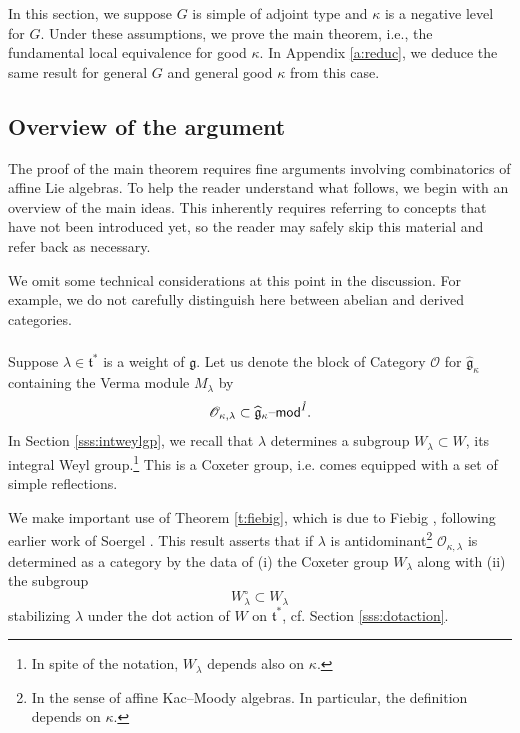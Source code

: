 \documentclass[11pt,reqno]{amsart}
\newcommand{\g}{\widehat{\mathfrak{g}}}
\newcommand{\ft}{\mathfrak{t}}
\newcommand{\fg}{\mathfrak{g}}
\newcommand{\OO}{\mathscr{O}}
\newcommand{\gk}{\g_\kappa}
\theoremstyle{remark}
\numberwithin{equation}{section}
\renewcommand{\mod}{\text{\textendash}\mathsf{mod}}
\begin{document}
In this section, we suppose $G$ is simple of adjoint type
and $\kappa$ is a negative level for $G$. Under these assumptions,
we prove the main theorem, i.e., the fundamental local
equivalence for good $\kappa$. In Appendix \ref{a:reduc}, we deduce the 
same result for general $G$ and general good $\kappa$ from this case.

\subsection{Overview of the argument}\label{ss:overview}

The proof of the main theorem requires fine arguments involving
combinatorics of affine Lie algebras. To help the reader understand what
follows, we begin with an overview
of the main ideas. 
This inherently requires referring to concepts that have not been
introduced yet, so the reader may safely skip this material and
refer back as necessary.

We omit some technical considerations at this point
in the discussion. For example, we do not carefully
distinguish here between abelian and derived
categories.

\subsubsection{}

Suppose $\lambda \in \ft^{*}$ is a weight of $\fg$.
Let us denote the block of Category $\OO$ for $\gk$ containing the Verma module 
$M_\lambda$ by 
%
\[\OO_{\kappa,\lambda} \subset 
\widehat{\fg}_{\kappa}\mod^{\mathring{I}}.\]
%
\noindent In Section \ref{sss:intweylgp}, we recall that $\lambda$ determines a 
subgroup
$W_{\lambda} \subset W$, its integral Weyl group.\footnote{In spite of 
the notation, $W_{\lambda}$ depends also on $\kappa$.} This is a 
Coxeter group, i.e. comes equipped with a set of simple reflections.

We make important use of Theorem \ref{t:fiebig}, which is due to 
Fiebig \cite{fiebig}, following earlier
work of Soergel \cite{soergel}. 
This result asserts that 
if $\lambda$ is antidominant\footnote{In the sense of affine Kac--Moody
algebras. In particular, the definition depends on $\kappa$.} 
$\OO_{\kappa,\lambda}$ is 
determined as a category by the data of (i) the Coxeter group $W_{\lambda}$ 
along with (ii) the subgroup 
%
\begin{equation}
\label{e:sfd} W_\lambda^\circ \subset W_\lambda\end{equation} 
%
stabilizing $\lambda$ under the 
dot action of $W$ on $\ft^*$, cf. 
Section \ref{sss:dotaction}.
\end{document}
